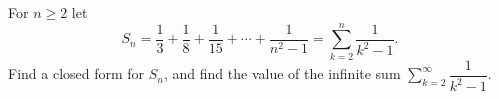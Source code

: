 For $n\ge2$ let
\[S_n=\dfrac13+\dfrac18+\dfrac1{15}+\cdots+\dfrac{1}{n^2-1}=\sum_{k=2}^{n}\dfrac{1}{k^2-1}.\]
Find a closed form for $S_n$, and find the value of the infinite sum $\displaystyle\sum_{k=2}^{\infty}\dfrac1{k^2-1}$.
